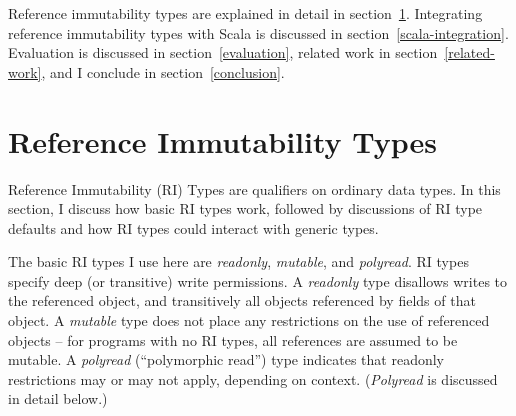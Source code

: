 \documentclass[letterpaper,11pt]{article}
\theoremstyle{definition}
\theoremstyle{remark}
\begin{document}



Reference immutability types are explained in detail in section~\ref{ri_types}.
Integrating reference immutability types with Scala is discussed in section~\ref{scala-integration}.
Evaluation is discussed in section~\ref{evaluation},
related work in section~\ref{related-work}, and
I conclude in section~\ref{conclusion}.




\section{Reference Immutability Types}
\label{ri_types}

% 


Reference Immutability (RI) Types are qualifiers on ordinary data types.
In this section, I discuss how basic RI types work, followed by discussions
of RI type defaults and how RI types could interact with generic types.

The basic RI types I use here are \emph{readonly}, \emph{mutable}, and \emph{polyread}.
RI types specify deep (or transitive) write permissions.
A \emph{readonly} type disallows writes to the referenced object, and transitively
all objects referenced by fields of that object.
A \emph{mutable} type does not place any restrictions on the use of referenced objects --
for programs with no RI types, all references are assumed to be mutable.
A \emph{polyread} (``polymorphic read'') type indicates that readonly restrictions may or may not apply,
depending on context. (\emph{Polyread} is discussed in detail below.)
\end{document}
